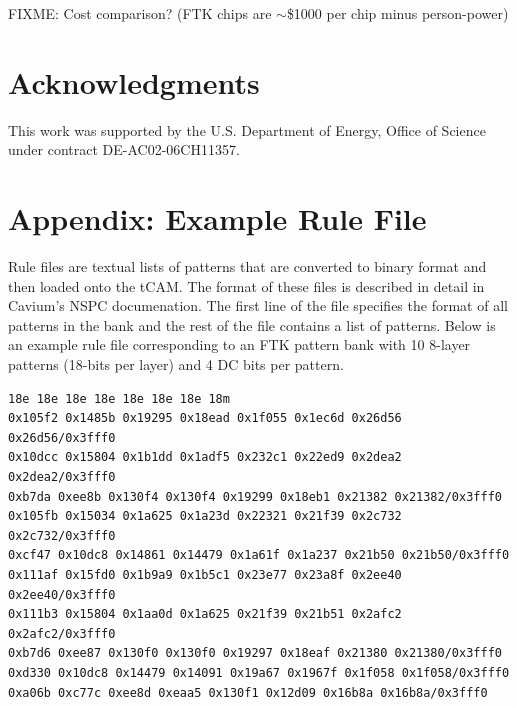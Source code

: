 \documentclass[preprint,prd,showpacs]{revtex4-1}
\begin{document}
FIXME: Cost comparison? (FTK chips are $\sim$\$1000 per chip minus person-power)


\section{Acknowledgments}
This work was supported by the U.S. Department of Energy, Office of Science under contract DE-AC02-06CH11357.



\section{Appendix: Example Rule File}\label{app:ExampleRuleFile}

Rule files are textual lists of patterns that are converted to binary format and then loaded onto the tCAM. The format of these files is described in detail in Cavium's NSPC documenation. The first line of the file specifies the format of all patterns in the bank and the rest of the file contains a list of patterns. Below is an example rule file corresponding to an FTK pattern bank with 10 8-layer patterns (18-bits per layer) and 4 DC bits per pattern.

\begin{lstlisting}[mathescape,basicstyle=\small\ttfamily]
18e 18e 18e 18e 18e 18e 18e 18m
0x105f2 0x1485b 0x19295 0x18ead 0x1f055 0x1ec6d 0x26d56 0x26d56/0x3fff0
0x10dcc 0x15804 0x1b1dd 0x1adf5 0x232c1 0x22ed9 0x2dea2 0x2dea2/0x3fff0
0xb7da 0xee8b 0x130f4 0x130f4 0x19299 0x18eb1 0x21382 0x21382/0x3fff0
0x105fb 0x15034 0x1a625 0x1a23d 0x22321 0x21f39 0x2c732 0x2c732/0x3fff0
0xcf47 0x10dc8 0x14861 0x14479 0x1a61f 0x1a237 0x21b50 0x21b50/0x3fff0
0x111af 0x15fd0 0x1b9a9 0x1b5c1 0x23e77 0x23a8f 0x2ee40 0x2ee40/0x3fff0
0x111b3 0x15804 0x1aa0d 0x1a625 0x21f39 0x21b51 0x2afc2 0x2afc2/0x3fff0
0xb7d6 0xee87 0x130f0 0x130f0 0x19297 0x18eaf 0x21380 0x21380/0x3fff0
0xd330 0x10dc8 0x14479 0x14091 0x19a67 0x1967f 0x1f058 0x1f058/0x3fff0
0xa06b 0xc77c 0xee8d 0xeaa5 0x130f1 0x12d09 0x16b8a 0x16b8a/0x3fff0
\end{lstlisting}
\end{document}
